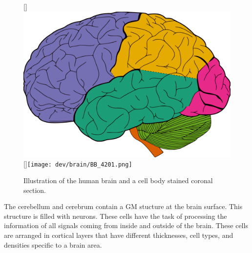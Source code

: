 \begin{figure}[!t]
\centering
\setlength{\tikzwidth}{0.475\textwidth}
[\tikzwidth]{\includegraphics[height=0.3\textwidth]{gfx/neuroanatomy/brain_lobes.pdf}}
\hfill
\tikzset{external/export next=false}
%
    [\tikzwidth]{\texttt{[image: dev/brain/BB\_4201.png]}}
\caption{Illustration of the human brain and a cell body stained coronal section.}
\label{fig:humanBrain}
\end{figure}
%
The cerebellum and cerebrum contain a \ac{GM} stucture at the brain surface.
This structure is filled with neurons.
These cells have the task of processing the information of all signals coming from inside and outside of the brain.
These cells are arranged in cortical layers that have different thicknesses, cell types, and densities specific to a brain area.

